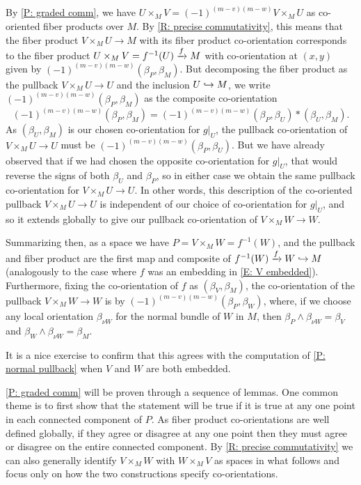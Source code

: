 \begin{example}
	By \cref{P: graded comm}, we have $U \times_M V = (-1)^{(m-v)(m-w)}V \times_M U$ as co-oriented fiber products over $M$.
	By \cref{R: precise commutativity}, this means that the fiber product $V \times_M U \to M$ with its fiber product co-orientation corresponds to the fiber product $U \times_M V = f^{-1}(U) \xrightarrow{f} M$ with co-orientation at $(x,y)$ given by $(-1)^{(m-v)(m-w)}(\beta_P, \beta_M)$.
	But decomposing the fiber product as the pullback $V \times_M U \to U$ and the inclusion $U \hookrightarrow M$, we write $(-1)^{(m-v)(m-w)}(\beta_P, \beta_M)$ as the composite co-orientation
	$$(-1)^{(m-v)(m-w)}(\beta_P, \beta_M) = (-1)^{(m-v)(m-w)}(\beta_P, \beta_U)*(\beta_U, \beta_M).$$
	As $(\beta_U, \beta_M)$ is our chosen co-orientation for $g|_U$, the pullback co-orientation of $V \times_M U \to U$ must be $(-1)^{(m-v)(m-w)}(\beta_P, \beta_U)$.
	But we have already observed that if we had chosen the opposite co-orientation for $g|_U$, that would reverse the signs of both $\beta_U$ and $\beta_P$, so in either case we obtain the same pullback co-orientation for $V \times_M U \to U$.
	In other words, this description of the co-oriented pullback $V \times_M U \to U$ is independent of our choice of co-orientation for $g|_U$, and so it extends globally to give our pullback co-orientation of $V \times_M W \to W$.

	Summarizing then, as a space we have $P = V \times_M W = f^{-1}(W)$, and the pullback and fiber product are the first map and composite of $f^{-1}(W) \xrightarrow{f} W \hookrightarrow M$ (analogously to the case where $f$ was an embedding in \cref{E: V embedded}).
	Furthermore, fixing the co-orientation of $f$ as $(\beta_V, \beta_M)$, the co-orientation of the pullback $V \times_M W \to W$ is by $(-1)^{(m-v)(m-w)}(\beta_P, \beta_W)$, where, if we choose any local orientation $\beta_{\nu W}$ for the normal bundle of $W$ in $M$, then $\beta_P \wedge \beta_{\nu W} = \beta_V$ and $\beta_W \wedge \beta_{\nu W} = \beta_M$.

	It is a nice exercise to confirm that this agrees with the computation of \cref{P: normal pullback} when $V$ and $W$ are both embedded.
\end{example}

\cref{P: graded comm} will be proven through a sequence of lemmas.
One common theme is to first show that the statement will be true if it is true at any one point in each connected component of $P$.
As fiber product co-orientations are well defined globally, if they agree or disagree at any one point then they must agree or disagree on the entire connected component.
By \cref{R: precise commutativity} we can also generally identify $V \times_M W$ with $W \times_M V$ as spaces in what follows and focus only on how the two constructions specify co-orientations.

